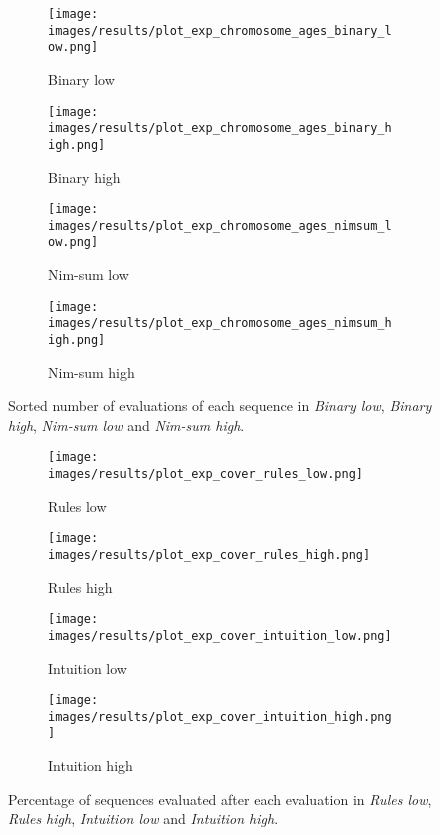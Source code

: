 \begin{figure}[ht]
	\begin{subfigure}{0.49\linewidth}
	\centering
	\texttt{[image: images/results/plot\_exp\_chromosome\_ages\_binary\_low.png]}
	\caption{Binary low}
	\label{fig:exp_age_binary_low}
	\end{subfigure}
	\hfill
	\begin{subfigure}{0.49\linewidth}
	\centering
	\texttt{[image: images/results/plot\_exp\_chromosome\_ages\_binary\_high.png]}
	\caption{Binary high}
	\label{fig:exp_age_binary_high}
	\end{subfigure}
	\begin{subfigure}{0.49\linewidth}
	\centering
	\texttt{[image: images/results/plot\_exp\_chromosome\_ages\_nimsum\_low.png]}
	\caption{Nim-sum low}
	\label{fig:exp_age_nimsum_low}
	\end{subfigure}
	\hfill
	\begin{subfigure}{0.49\linewidth}
	\centering
	\texttt{[image: images/results/plot\_exp\_chromosome\_ages\_nimsum\_high.png]}
	\caption{Nim-sum high}
	\label{fig:exp_age_nimsum_high}
	\end{subfigure}
	\caption{Sorted number of evaluations of each sequence in \emph{Binary
	low}, \emph{Binary high}, \emph{Nim-sum low} and \emph{Nim-sum high}.}
	\label{fig:exp_ages2}
\end{figure}


\begin{figure}[ht]
	\begin{subfigure}{0.49\linewidth}
	\centering
	\texttt{[image: images/results/plot\_exp\_cover\_rules\_low.png]}
	\caption{Rules low}
	\label{fig:exp_cover_rules_low}
	\end{subfigure}
	\hfill
	\begin{subfigure}{0.49\linewidth}
	\centering
	\texttt{[image: images/results/plot\_exp\_cover\_rules\_high.png]}
	\caption{Rules high}
	\label{fig:exp_cover_rules_high}
	\end{subfigure}
	\begin{subfigure}{0.49\linewidth}
	\centering
	\texttt{[image: images/results/plot\_exp\_cover\_intuition\_low.png]}
	\caption{Intuition low}
	\label{fig:exp_cover_intuition_low}
	\end{subfigure}
	\hfill
	\begin{subfigure}{0.49\linewidth}
	\centering
	\texttt{[image: images/results/plot\_exp\_cover\_intuition\_high.png]}
	\caption{Intuition high}
	\label{fig:exp_cover_intuition_high}
	\end{subfigure}
	\caption{Percentage of sequences evaluated after each evaluation in \emph{Rules
	low}, \emph{Rules high}, \emph{Intuition low} and \emph{Intuition high}.}
	\label{fig:exp_cover1}
\end{figure}

